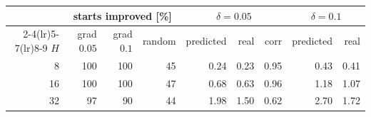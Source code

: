 \begin{tabular}{rrrrrrrrr}\toprule
 & \multicolumn{3}{c}{starts improved [\%]} & \multicolumn{3}{c}{$\delta=0.05$} & \multicolumn{2}{c}{$\delta=0.1$} \\
\cmidrule(lr){2-4}\cmidrule(lr){5-7}\cmidrule(lr){8-9}
$H$ & grad $0.05$ & grad $0.1$ & random & predicted & real & corr & predicted & real \\\midrule
8 & 100 & 100 & 45 & 0.24 & 0.23 & 0.95 & 0.43 & 0.41 \\
16 & 100 & 100 & 47 & 0.68 & 0.63 & 0.96 & 1.18 & 1.07 \\
32 & 97 & 90 & 44 & 1.98 & 1.50 & 0.62 & 2.70 & 1.72 \\
\bottomrule\end{tabular}
